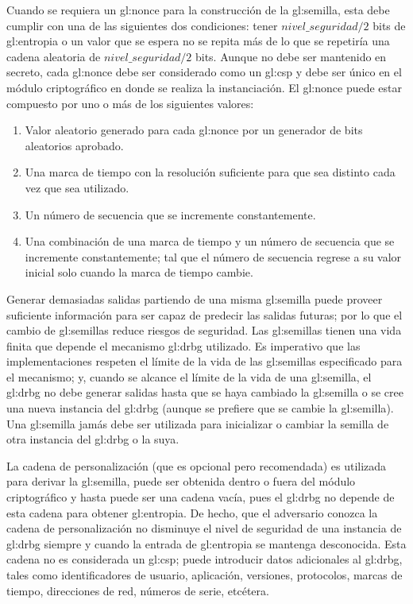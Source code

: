 Cuando se requiera un \gls{gl:nonce} para la construcción de la
\gls{gl:semilla}, esta debe cumplir con una de las siguientes dos condiciones:
tener $nivel\_seguridad/2$ bits de \gls{gl:entropia} o un valor que se espera
no se repita más de lo que se repetiría una cadena aleatoria de
$nivel\_seguridad/2$ bits. Aunque no debe ser mantenido en secreto, cada
\gls{gl:nonce} debe ser considerado como un \gls{gl:csp} y debe ser único en
el módulo criptográfico en donde se realiza la instanciación. El \gls{gl:nonce}
puede estar compuesto por uno o más de los siguientes valores:
\begin{enumerate}
  \item Valor aleatorio generado para cada \gls{gl:nonce} por un generador
    de bits aleatorios aprobado.
  \item Una marca de tiempo con la resolución suficiente para que sea distinto
    cada vez que sea utilizado.
  \item Un número de secuencia que se incremente constantemente.
  \item Una combinación de una marca de tiempo y un número de secuencia que se
    incremente constantemente; tal que el número de secuencia regrese a su
    valor inicial solo cuando la marca de tiempo cambie.
\end{enumerate}

Generar demasiadas salidas partiendo de una misma \gls{gl:semilla} puede proveer
suficiente información para ser capaz de predecir las salidas futuras; por lo
que el cambio de \glspl{gl:semilla} reduce riesgos de seguridad. Las
\glspl{gl:semilla} tienen una vida finita que depende el mecanismo \gls{gl:drbg}
utilizado. Es imperativo que las implementaciones respeten el límite de la vida
de las \glspl{gl:semilla} especificado para el mecanismo; y, cuando se alcance
el límite de la vida de una \gls{gl:semilla}, el \gls{gl:drbg} no debe generar
salidas hasta que se haya cambiado la \gls{gl:semilla} o se cree una nueva
instancia del \gls{gl:drbg} (aunque se prefiere que se cambie la
\gls{gl:semilla}). Una \gls{gl:semilla} jamás debe ser utilizada para
inicializar o cambiar la semilla de otra instancia del \gls{gl:drbg} o la suya.

La cadena de personalización (que es opcional pero recomendada) es utilizada
para derivar la \gls{gl:semilla}, puede ser obtenida dentro o fuera del
módulo criptográfico y hasta puede ser una cadena vacía, pues el \gls{gl:drbg}
no depende de esta cadena para obtener \gls{gl:entropia}. De hecho, que
el adversario conozca la cadena de personalización no disminuye el nivel de
seguridad de una instancia de \gls{gl:drbg} siempre y cuando la entrada de
\gls{gl:entropia} se mantenga desconocida. Esta cadena no es considerada un
\gls{gl:csp}; puede introducir datos adicionales al \gls{gl:drbg}, tales como
identificadores de usuario, aplicación, versiones, protocolos, marcas de tiempo,
direcciones de red, números de serie, etcétera.
